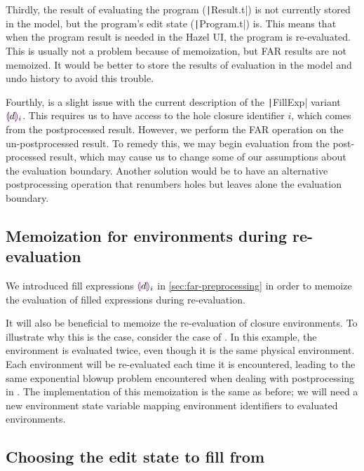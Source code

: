 Thirdly, the result of evaluating the program (\texttt|Result.t|) is not currently stored in the model, but the program's edit state (\texttt|Program.t|) is. This means that when the program result is needed in the Hazel UI, the program is re-evaluated. This is usually not a problem because of memoization, but FAR results are not memoized. It would be better to store the results of evaluation in the model and undo history to avoid this trouble.

Fourthly, is a slight issue with the current description of the \texttt|FillExp| variant $\textcolor{violet}{\llparenthesis} d\textcolor{violet}{\rrparenthesis}_i$. This requires us to have access to the hole closure identifier $i$, which comes from the postprocessed result. However, we perform the FAR operation on the un-postprocessed result. To remedy this, we may begin evaluation from the post-processed result, which may cause us to change some of our assumptions about the evaluation boundary. Another solution would be to have an alternative postprocessing operation that renumbers holes but leaves alone the evaluation boundary.

\subsection{Memoization for environments during re-evaluation}
\label{sec:far-improv-memo-envs}

We introduced fill expressions $\textcolor{violet}{\llparenthesis} d\textcolor{violet}{\rrparenthesis}_i$ in \cref{sec:far-preprocessing} in order to memoize the evaluation of filled expressions during re-evaluation.

It will also be beneficial to memoize the re-evaluation of closure environments. To illustrate why this is the case, consider the case of . In this example, the environment is evaluated twice, even though it is the same physical environment. Each environment will be re-evaluated each time it is encountered, leading to the same exponential blowup problem encountered when dealing with postprocessing in . The implementation of this memoization is the same as before; we will need a new environment state variable mapping environment identifiers to evaluated environments.

\subsection{Choosing the edit state to fill from}
\label{sec:far-past-edit-states}

